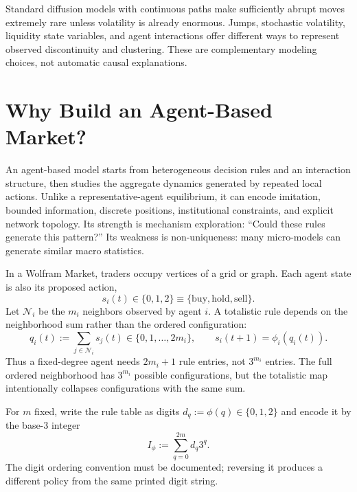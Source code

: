 \documentclass[11pt]{article}
\begin{document}
Standard diffusion models with continuous paths make sufficiently abrupt moves extremely rare unless volatility is already enormous. Jumps, stochastic volatility, liquidity state variables, and agent interactions offer different ways to represent observed discontinuity and clustering. These are complementary modeling choices, not automatic causal explanations.

\section{Why Build an Agent-Based Market?}

An agent-based model starts from heterogeneous decision rules and an interaction structure, then studies the aggregate dynamics generated by repeated local actions. Unlike a representative-agent equilibrium, it can encode imitation, bounded information, discrete positions, institutional constraints, and explicit network topology. Its strength is mechanism exploration: ``Could these rules generate this pattern?'' Its weakness is non-uniqueness: many micro-models can generate similar macro statistics.

In a Wolfram Market, traders occupy vertices of a grid or graph. Each agent state is also its proposed action,
\begin{equation}
  \label{eq:states}
  s_i(t)\in\{0,1,2\}
  \equiv\{\text{buy},\text{hold},\text{sell}\}.
\end{equation}
Let $\mathcal N_i$ be the $m_i$ neighbors observed by agent $i$. A totalistic rule depends on the neighborhood sum rather than the ordered configuration:
\begin{equation}
  \label{eq:totalistic-state}
  q_i(t):=\sum_{j\in\mathcal N_i}s_j(t)
  \in\{0,1,\ldots,2m_i\},
  \qquad
  s_i(t+1)=\phi_i(q_i(t)).
\end{equation}
Thus a fixed-degree agent needs $2m_i+1$ rule entries, not $3^{m_i}$ entries. The full ordered neighborhood has $3^{m_i}$ possible configurations, but the totalistic map intentionally collapses configurations with the same sum.

For $m$ fixed, write the rule table as digits $d_q:=\phi(q)\in\{0,1,2\}$ and encode it by the base-3 integer
\begin{equation}
  \label{eq:rule-index}
  I_\phi:=\sum_{q=0}^{2m}d_q3^q.
\end{equation}
The digit ordering convention must be documented; reversing it produces a different policy from the same printed digit string.
\end{document}
